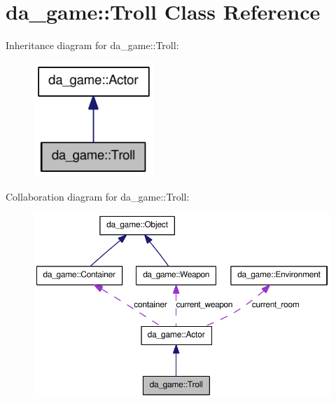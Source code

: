 \hypertarget{classda__game_1_1Troll}{
\section{da\_\-game::Troll Class Reference}
\label{classda__game_1_1Troll}
}
Inheritance diagram for da\_\-game::Troll:\nopagebreak
\begin{figure}[H]
\begin{center}
\leavevmode
\includegraphics[width=128pt]{classda__game_1_1Troll__inherit__graph}
\end{center}
\end{figure}
Collaboration diagram for da\_\-game::Troll:\nopagebreak
\begin{figure}[H]
\begin{center}
\leavevmode
\includegraphics[width=394pt]{classda__game_1_1Troll__coll__graph}
\end{center}
\end{figure}
